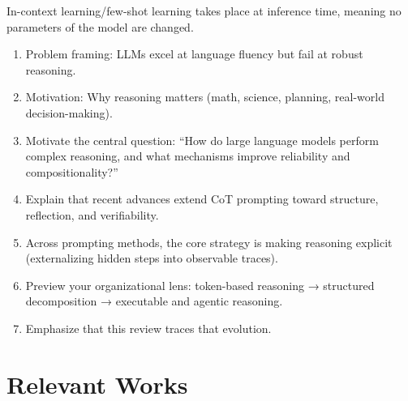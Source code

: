\documentclass[project]{bsu-cs}  %
\begin{document}
In-context learning/few-shot learning takes place at inference time, meaning no parameters of the model are changed.
% 
\begin{enumerate}
    \item Problem framing: LLMs excel at language fluency but fail at robust reasoning.
    
    \item Motivation: Why reasoning matters (math, science, planning, real-world decision-making).
    
    \item Motivate the central question: “How do large language models perform complex reasoning, and what mechanisms improve reliability and compositionality?”

    \item Explain that recent advances extend CoT prompting toward structure, reflection, and verifiability.

    \item Across prompting methods, the core strategy is making reasoning explicit (externalizing hidden steps into observable traces).

    \item Preview your organizational lens: token-based reasoning → structured decomposition → executable and agentic reasoning.

    \item Emphasize that this review traces that evolution.
\end{enumerate}
% 
\chapter{Relevant Works}\label{ch:works}
%
%
\end{document}
